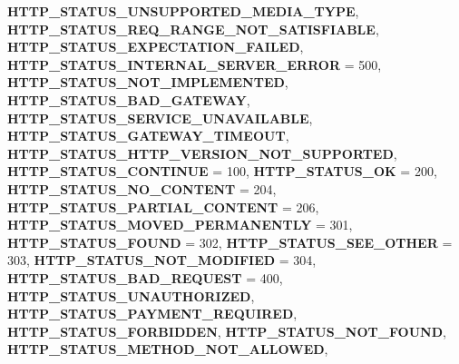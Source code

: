 \begin{DoxyCompactItemize}
{\bfseries H\+T\+T\+P\+\_\+\+S\+T\+A\+T\+U\+S\+\_\+\+U\+N\+S\+U\+P\+P\+O\+R\+T\+E\+D\+\_\+\+M\+E\+D\+I\+A\+\_\+\+T\+Y\+PE}, 
{\bfseries H\+T\+T\+P\+\_\+\+S\+T\+A\+T\+U\+S\+\_\+\+R\+E\+Q\+\_\+\+R\+A\+N\+G\+E\+\_\+\+N\+O\+T\+\_\+\+S\+A\+T\+I\+S\+F\+I\+A\+B\+LE}, 
{\bfseries H\+T\+T\+P\+\_\+\+S\+T\+A\+T\+U\+S\+\_\+\+E\+X\+P\+E\+C\+T\+A\+T\+I\+O\+N\+\_\+\+F\+A\+I\+L\+ED}, 
\newline
{\bfseries H\+T\+T\+P\+\_\+\+S\+T\+A\+T\+U\+S\+\_\+\+I\+N\+T\+E\+R\+N\+A\+L\+\_\+\+S\+E\+R\+V\+E\+R\+\_\+\+E\+R\+R\+OR} = 500, 
{\bfseries H\+T\+T\+P\+\_\+\+S\+T\+A\+T\+U\+S\+\_\+\+N\+O\+T\+\_\+\+I\+M\+P\+L\+E\+M\+E\+N\+T\+ED}, 
{\bfseries H\+T\+T\+P\+\_\+\+S\+T\+A\+T\+U\+S\+\_\+\+B\+A\+D\+\_\+\+G\+A\+T\+E\+W\+AY}, 
{\bfseries H\+T\+T\+P\+\_\+\+S\+T\+A\+T\+U\+S\+\_\+\+S\+E\+R\+V\+I\+C\+E\+\_\+\+U\+N\+A\+V\+A\+I\+L\+A\+B\+LE}, 
\newline
{\bfseries H\+T\+T\+P\+\_\+\+S\+T\+A\+T\+U\+S\+\_\+\+G\+A\+T\+E\+W\+A\+Y\+\_\+\+T\+I\+M\+E\+O\+UT}, 
{\bfseries H\+T\+T\+P\+\_\+\+S\+T\+A\+T\+U\+S\+\_\+\+H\+T\+T\+P\+\_\+\+V\+E\+R\+S\+I\+O\+N\+\_\+\+N\+O\+T\+\_\+\+S\+U\+P\+P\+O\+R\+T\+ED}, 
{\bfseries H\+T\+T\+P\+\_\+\+S\+T\+A\+T\+U\+S\+\_\+\+C\+O\+N\+T\+I\+N\+UE} = 100, 
{\bfseries H\+T\+T\+P\+\_\+\+S\+T\+A\+T\+U\+S\+\_\+\+OK} = 200, 
\newline
{\bfseries H\+T\+T\+P\+\_\+\+S\+T\+A\+T\+U\+S\+\_\+\+N\+O\+\_\+\+C\+O\+N\+T\+E\+NT} = 204, 
{\bfseries H\+T\+T\+P\+\_\+\+S\+T\+A\+T\+U\+S\+\_\+\+P\+A\+R\+T\+I\+A\+L\+\_\+\+C\+O\+N\+T\+E\+NT} = 206, 
{\bfseries H\+T\+T\+P\+\_\+\+S\+T\+A\+T\+U\+S\+\_\+\+M\+O\+V\+E\+D\+\_\+\+P\+E\+R\+M\+A\+N\+E\+N\+T\+LY} = 301, 
{\bfseries H\+T\+T\+P\+\_\+\+S\+T\+A\+T\+U\+S\+\_\+\+F\+O\+U\+ND} = 302, 
\newline
{\bfseries H\+T\+T\+P\+\_\+\+S\+T\+A\+T\+U\+S\+\_\+\+S\+E\+E\+\_\+\+O\+T\+H\+ER} = 303, 
{\bfseries H\+T\+T\+P\+\_\+\+S\+T\+A\+T\+U\+S\+\_\+\+N\+O\+T\+\_\+\+M\+O\+D\+I\+F\+I\+ED} = 304, 
{\bfseries H\+T\+T\+P\+\_\+\+S\+T\+A\+T\+U\+S\+\_\+\+B\+A\+D\+\_\+\+R\+E\+Q\+U\+E\+ST} = 400, 
{\bfseries H\+T\+T\+P\+\_\+\+S\+T\+A\+T\+U\+S\+\_\+\+U\+N\+A\+U\+T\+H\+O\+R\+I\+Z\+ED}, 
\newline
{\bfseries H\+T\+T\+P\+\_\+\+S\+T\+A\+T\+U\+S\+\_\+\+P\+A\+Y\+M\+E\+N\+T\+\_\+\+R\+E\+Q\+U\+I\+R\+ED}, 
{\bfseries H\+T\+T\+P\+\_\+\+S\+T\+A\+T\+U\+S\+\_\+\+F\+O\+R\+B\+I\+D\+D\+EN}, 
{\bfseries H\+T\+T\+P\+\_\+\+S\+T\+A\+T\+U\+S\+\_\+\+N\+O\+T\+\_\+\+F\+O\+U\+ND}, 
{\bfseries H\+T\+T\+P\+\_\+\+S\+T\+A\+T\+U\+S\+\_\+\+M\+E\+T\+H\+O\+D\+\_\+\+N\+O\+T\+\_\+\+A\+L\+L\+O\+W\+ED}, 
\newline

\end{DoxyCompactItemize}
